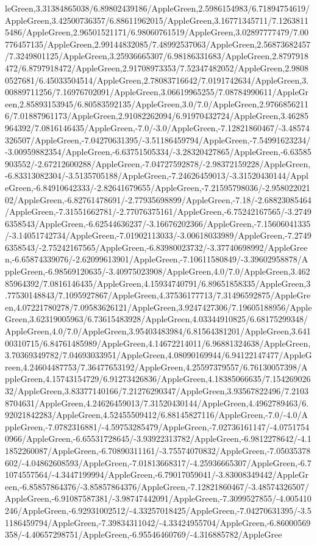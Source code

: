 {\begin{tikzternal}
leGreen,3.31384865038/6.89802439186/AppleGreen,2.5986154983/6.71894754619/AppleGreen,3.42500736357/6.88611962015/AppleGreen,3.16771345711/7.12638115486/AppleGreen,2.96501521171/6.98060761519/AppleGreen,3.02897777479/7.00776457135/AppleGreen,2.99144832085/7.48992537063/AppleGreen,2.56873682457/7.3249801125/AppleGreen,3.25936665307/6.98186331683/AppleGreen,2.8797918472/6.8797918472/AppleGreen,2.91708973353/7.52347482052/AppleGreen,2.98080527681/6.45033504514/AppleGreen,2.78083716642/7.0191742634/AppleGreen,3.00889711256/7.16976702091/AppleGreen,3.06619965255/7.08784990611/AppleGreen,2.85893153945/6.80583592135/AppleGreen,3.0/7.0/AppleGreen,2.97668562116/7.01887961173/AppleGreen,2.91082262094/6.91970432724/AppleGreen,3.46285964392/7.0816146435/AppleGreen,-7.0/-3.0/AppleGreen,-7.12821860467/-3.48574326507/AppleGreen,-7.04270631395/-3.51186459794/AppleGreen,-7.54991623234/-3.00959882354/AppleGreen,-6.63751505334/-3.28320427865/AppleGreen,-6.63585903552/-2.67212600288/AppleGreen,-7.04727592878/-2.98372159228/AppleGreen,-6.83313082304/-3.5135705188/AppleGreen,-7.24626459013/-3.31520430144/AppleGreen,-6.84910642333/-2.82641679655/AppleGreen,-7.21595798036/-2.95802202102/AppleGreen,-6.82761478691/-2.77935698899/AppleGreen,-7.18/-2.68823085464/AppleGreen,-7.31551662781/-2.77076375161/AppleGreen,-6.75242167565/-3.27496358543/AppleGreen,-6.62544636237/-3.16676202366/AppleGreen,-7.15606041335/-3.14051742734/AppleGreen,-7.01902113033/-3.00618033989/AppleGreen,-7.27496358543/-2.75242167565/AppleGreen,-6.83980023732/-3.37740698992/AppleGreen,-6.65874339076/-2.62099613901/AppleGreen,-7.10611580849/-3.39602958878/AppleGreen,-6.98569120635/-3.40975023908/AppleGreen,4.0/7.0/AppleGreen,3.46285964392/7.0816146435/AppleGreen,4.15934740791/6.89651858335/AppleGreen,3.77530148843/7.1095927867/AppleGreen,4.37536177713/7.31496592875/AppleGreen,4.07221780278/7.09583626121/AppleGreen,3.9247427306/7.19605188956/AppleGreen,3.62319005963/6.73615483928/AppleGreen,4.03344910825/6.68175299348/AppleGreen,4.0/7.0/AppleGreen,3.95403483984/6.81564381201/AppleGreen,3.64100310715/6.84761485989/AppleGreen,4.14672214011/6.96881324638/AppleGreen,3.70369349782/7.04693033951/AppleGreen,4.08090169944/6.94122147477/AppleGreen,4.24604487753/7.36477653192/AppleGreen,4.25597379557/6.76130057398/AppleGreen,4.15743154729/6.91273426836/AppleGreen,4.18385066635/7.15426902632/AppleGreen,3.83377140166/7.21276290347/AppleGreen,3.93567822496/7.21038704631/AppleGreen,4.24626459013/7.31520430144/AppleGreen,4.4962789463/6.92021842283/AppleGreen,4.52455509412/6.88145827116/AppleGreen,-7.0/-4.0/AppleGreen,-7.0782316881/-4.59753285479/AppleGreen,-7.02736161147/-4.07517540966/AppleGreen,-6.65531728645/-3.93922313782/AppleGreen,-6.9812278642/-4.11852260087/AppleGreen,-6.70890311161/-3.75574070832/AppleGreen,-7.05035378602/-4.04862608593/AppleGreen,-7.01813668317/-4.25936665307/AppleGreen,-6.71074557564/-4.3447199994/AppleGreen,-6.79017059041/-3.83008349442/AppleGreen,-6.85857864376/-3.85857864376/AppleGreen,-7.12821860467/-3.48574326507/AppleGreen,-6.91087587381/-3.98747442091/AppleGreen,-7.3099527855/-4.005410246/AppleGreen,-6.92931002512/-4.33257018425/AppleGreen,-7.04270631395/-3.51186459794/AppleGreen,-7.39834311042/-4.33424955704/AppleGreen,-6.86000569358/-4.40657298751/AppleGreen,-6.95546460769/-4.316885782/AppleGree
\end{tikzternal}}
